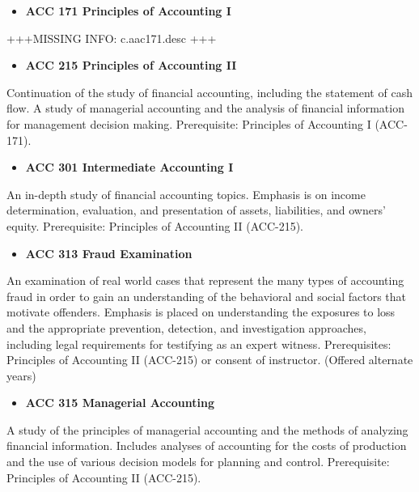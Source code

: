 \documentclass[
  letterpaper,
]{scrbook}
\providecommand{\tightlist}{%
  \setlength{\itemsep}{0pt}\setlength{\parskip}{0pt}}
\begin{document}
\begin{itemize}
\tightlist
\item
  \textbf{ACC 171 Principles of Accounting I}
\end{itemize}

+++MISSING INFO: c.aac171.desc +++

\begin{itemize}
\tightlist
\item
  \textbf{ACC 215 Principles of Accounting II}
\end{itemize}

Continuation of the study of financial accounting, including the
statement of cash flow. A study of managerial accounting and the
analysis of financial information for management decision making.
Prerequisite: Principles of Accounting I (ACC-171).

\begin{itemize}
\tightlist
\item
  \textbf{ACC 301 Intermediate Accounting I}
\end{itemize}

An in-depth study of financial accounting topics. Emphasis is on income
determination, evaluation, and presentation of assets, liabilities, and
owners' equity. Prerequisite: Principles of Accounting II (ACC-215).

\begin{itemize}
\tightlist
\item
  \textbf{ACC 313 Fraud Examination}
\end{itemize}

An examination of real world cases that represent the many types of
accounting fraud in order to gain an understanding of the behavioral and
social factors that motivate offenders. Emphasis is placed on
understanding the exposures to loss and the appropriate prevention,
detection, and investigation approaches, including legal requirements
for testifying as an expert witness. Prerequisites: Principles of
Accounting II (ACC-215) or consent of instructor. (Offered alternate
years)

\begin{itemize}
\tightlist
\item
  \textbf{ACC 315 Managerial Accounting}
\end{itemize}

A study of the principles of managerial accounting and the methods of
analyzing financial information. Includes analyses of accounting for the
costs of production and the use of various decision models for planning
and control. Prerequisite: Principles of Accounting II (ACC-215).
\end{document}
